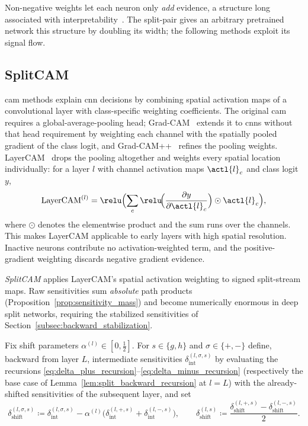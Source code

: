 Non-negative weights let each neuron only \emph{add} evidence, a structure long associated with interpretability~\parencite{ayinde2018nonnegativity,lee1999nmf}. The split-pair gives an arbitrary pretrained network this structure by doubling its width; the following methods exploit its signal flow.

\subsection{SplitCAM}\label{sec:split_cam}

\ac{cam} methods explain \ac{cnn} decisions by combining spatial activation maps of a convolutional layer with class-specific weighting coefficients. The original \ac{cam}~\parencite{Zhou2016} requires a global-average-pooling head; Grad-CAM~\parencite{Selvaraju2017} extends it to \acp{cnn} without that head requirement by weighting each channel with the spatially pooled gradient of the class logit, and Grad-CAM++~\parencite{Chattopadhay2018} refines the pooling weights. LayerCAM~\parencite{Jiang2021LayerCAM} drops the pooling altogether and weights every spatial location individually: for a layer $l$ with channel activation maps $\actl{l}_c$ and class logit $y$,
\begin{equation}
	\text{LayerCAM}^{(l)} = \relu\Bigl( \sum_{c} \relu\!\Bigl(\frac{\partial y}{\partial \actl{l}_c}\Bigr) \odot \actl{l}_c \Bigr),
	\label{eq:layercam}
\end{equation}
where $\odot$ denotes the elementwise product and the sum runs over the channels. This makes LayerCAM applicable to early layers with high spatial resolution. Inactive neurons contribute no activation-weighted term, and the positive-gradient weighting discards negative gradient evidence.

\emph{SplitCAM} applies LayerCAM's spatial activation weighting to signed split-stream maps. Raw sensitivities sum \emph{absolute} path products (Proposition~\ref{prop:sensitivity_mass}) and become numerically enormous in deep split networks, requiring the stabilized sensitivities of Section~\ref{subsec:backward_stabilization}.

\begin{definition}\label{def:shifted_sensitivities}
Fix shift parameters $\alpha^{(l)} \in [0, \tfrac{1}{2}]$. For $s \in \{g, h\}$ and $\sigma\in\{+,-\}$ define, backward from layer $L$, intermediate sensitivities $\delta_{\mathrm{int}}^{(l,\sigma, s)}$ by evaluating the recursions \eqref{eq:delta_plus_recursion}--\eqref{eq:delta_minus_recursion} (respectively the base case of Lemma~\ref{lem:split_backward_recursion} at $l = L$) with the already-shifted sensitivities of the subsequent layer, and set
\begin{equation}
	\delta_{\mathrm{shift}}^{(l,\sigma, s)}
	\coloneqq \delta_{\mathrm{int}}^{(l,\sigma, s)} - \alpha^{(l)} \bigl( \delta_{\mathrm{int}}^{(l, +, s)} + \delta_{\mathrm{int}}^{(l, -, s)} \bigr),
	\qquad
	\delta_{\mathrm{shift}}^{(l, s)} \coloneqq \frac{\delta_{\mathrm{shift}}^{(l, +, s)} - \delta_{\mathrm{shift}}^{(l, -, s)}}{2}.
	\label{eq:shift_definition}
\end{equation}
\end{definition}

